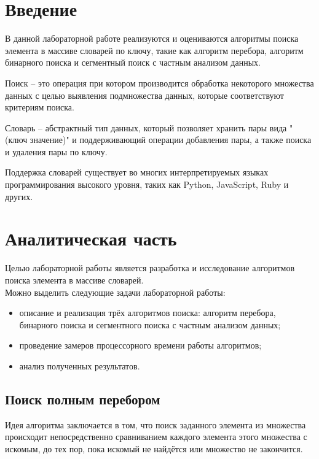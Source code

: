 \documentclass[12pt,a4paper]{report}
\begin{document}

\tableofcontents

\newpage
\chapter*{Введение}

В данной лабораторной работе реализуются и оцениваются алгоритмы поиска элемента в массиве словарей по ключу,
такие как алгоритм перебора, алгоритм бинарного поиска и сегментный поиск с частным анализом данных.

Поиск -- это операция при котором производится обработка некоторого множества данных с целью выявления 
подмножества данных, которые соответствуют критериям поиска. 

Словарь -- абстрактный тип данных, который позволяет хранить пары вида "(ключ значение)" и поддерживающий операции 
добавления пары, а также поиска и удаления пары по ключу. 

Поддержка словарей существует во многих интерпретируемых языках программирования высокого уровня, таких как Python, 
JavaScript, Ruby и других.

\newpage
\chapter{Аналитическая часть}

Целью лабораторной работы является разработка и исследование алгоритмов поиска элемента в массиве словарей.\\

Можно выделить следующие задачи лабораторной работы:
\begin{itemize}
    \item описание и реализация трёх алгоритмов поиска: алгоритм перебора, бинарного поиска и сегментного 
    поиска с частным анализом данных;
    \item проведение замеров процессорного времени работы алгоритмов;
    \item анализ полученных результатов.
\end{itemize}

\section{Поиск полным перебором}

Идея алгоритма заключается в том, что поиск заданного элемента из множества происходит непосредственно 
сравниванием каждого элемента этого множества с искомым, до тех пор, пока искомый не найдётся или множество
не закончится. 
\end{document}
